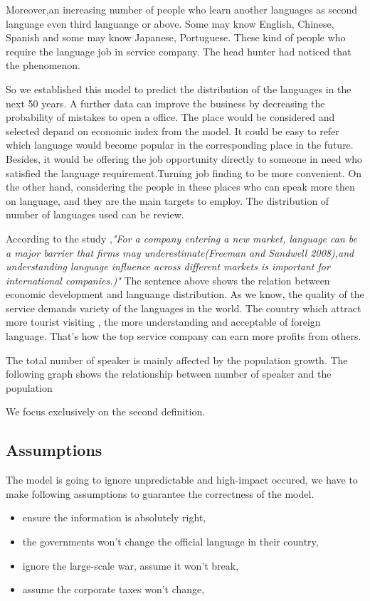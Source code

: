\documentclass{mcmthesis}
\begin{document}
Moreover,an increasing number of people who learn another languages as second language even third languange or above. 
Some may know English, Chinese, Spanish and some may know Japanese, Portuguese. These kind of people who require the language job in service company.
The head hunter had noticed that the phenomenon. 

So we established this model to predict the distribution of the languages in the next 50 years. A further data can improve the business by decreasing
the probability of mistakes to open a office. The place would be considered and selected depand on economic index from the model.
It could be easy to refer which language would become popular in the corresponding place in the future. Besides,
it would be offering the job opportunity directly to someone in need who satisfied the language requirement.Turning job finding to be more convenient.
On the other hand, considering the people in these places who can speak more then on language, and they are the 
main targets to employ. The distribution of number of languages used can be review.
 
 
According to the study \cite{hel},\emph{"For a company entering a new market, language can be a major barrier that firms
may underestimate(Freeman and Sandwell 2008),and understanding language influence across different markets is important for international companies.)" }
The sentence above shows the relation between economic development and languange distribution. As we know, the quality of the service demands variety of the languages in the world.
The country which attract more tourist visiting , the more understanding and acceptable of foreign language. 
That's how the top service company can earn more profits from others.



The total number of speaker is mainly affected by the population growth. The following graph shows the relationship between number of speaker and the population


We focus exclusively on the second definition.

\subsection{Assumptions}
\qquad The model is going to ignore unpredictable and high-impact occured, we have to make following assumptions to guarantee the correctness of the model.
\begin{itemize}
\item ensure the information is absolutely right, 
\item the governments won't change the official language in their country,
\item ignore the large-scale war, assume it won't break,
\item assume the corporate taxes won't change,

\end{itemize}
\end{document}
